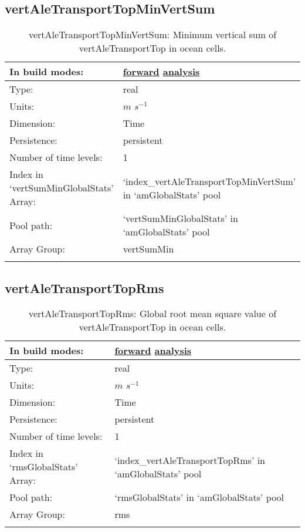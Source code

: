 \subsection[vertAleTransportTopMinVertSum]{vertAleTransportTopMinVertSum}
\label{subsec:var_sec_amGlobalStats_vertAleTransportTopMinVertSum}
\begin{center}
\begin{longtable}{| p{2.0in} | p{4.0in} |}
        \hline 
        In build modes: & \hyperref[subsec:forward_var_tab_amGlobalStats]{forward} \hyperref[subsec:analysis_var_tab_amGlobalStats]{analysis} \\
        \hline 
        Type: & real \\
        \hline 
        Units: & $m$ $s^{-1}$ \\
        \hline 
        Dimension: & Time \\
        \hline 
        Persistence: & persistent \\
        \hline 
        Number of time levels: & 1 \\
        \hline 
		 Index in `vertSumMinGlobalStats' Array: & `index\_vertAleTransportTopMinVertSum' in `amGlobalStats' pool \\
		 \hline 
            Pool path: & `vertSumMinGlobalStats' in `amGlobalStats' pool \\
		 \hline 
		 Array Group: & vertSumMin \\
		 \hline 
    \caption{vertAleTransportTopMinVertSum: Minimum vertical sum of vertAleTransportTop in ocean cells.}
\end{longtable}
\end{center}
\subsection[vertAleTransportTopRms]{vertAleTransportTopRms}
\label{subsec:var_sec_amGlobalStats_vertAleTransportTopRms}
\begin{center}
\begin{longtable}{| p{2.0in} | p{4.0in} |}
        \hline 
        In build modes: & \hyperref[subsec:forward_var_tab_amGlobalStats]{forward} \hyperref[subsec:analysis_var_tab_amGlobalStats]{analysis} \\
        \hline 
        Type: & real \\
        \hline 
        Units: & $m$ $s^{-1}$ \\
        \hline 
        Dimension: & Time \\
        \hline 
        Persistence: & persistent \\
        \hline 
        Number of time levels: & 1 \\
        \hline 
		 Index in `rmsGlobalStats' Array: & `index\_vertAleTransportTopRms' in `amGlobalStats' pool \\
		 \hline 
            Pool path: & `rmsGlobalStats' in `amGlobalStats' pool \\
		 \hline 
		 Array Group: & rms \\
		 \hline 
    \caption{vertAleTransportTopRms: Global root mean square value of vertAleTransportTop in ocean cells.}
\end{longtable}
\end{center}
